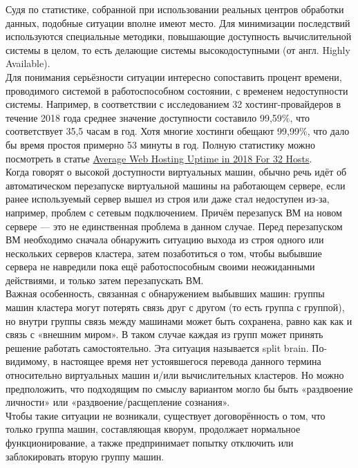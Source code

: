\documentclass[14pt, a4paper]{article}
\begin{document}
Судя по статистике, собранной при использовании реальных центров обработки данных, подобные
ситуации вполне имеют место. Для минимизации последствий используются специальные методики,
повышающие доступность вычислительной системы в целом, то есть делающие системы
высокодоступными (от англ. Highly Available).\\

Для понимания серьёзности ситуации интересно сопоставить процент времени, проводимого
системой в работоспособном состоянии, с временем недоступности системы. Например, в
соответствии с исследованием 32 хостинг-провайдеров в течение 2018 года среднее значение
доступности составило 99,59\%, что соответствует 35,5 часам в год. Хотя многие хостинги обещают
99,99\%, что дало бы время простоя примерно 53 минуты в год. Полную статистику можно посмотреть
в статье \href{https://hostingfacts.com/average-hosting-uptime-study/}{Average Web Hosting Uptime in 2018 For 32 Hosts}.\\

Когда говорят о высокой доступности виртуальных машин, обычно речь идёт об автоматическом
перезапуске виртуальной машины на работающем сервере, если ранее используемый сервер вышел
из строя или даже стал недоступен из-за, например, проблем с сетевым подключением. Причём
перезапуск ВМ на новом сервере — это не единственная проблема в данном случае. Перед
перезапуском ВМ необходимо сначала обнаружить ситуацию выхода из строя одного или нескольких
серверов кластера, затем позаботиться о том, чтобы выбывшие сервера не навредили пока ещё
работоспособным своими неожиданными действиями, и только затем перезапускать ВМ.\\

Важная особенность, связанная с обнаружением выбывших машин: группы машин кластера могут
потерять связь друг с другом (то есть группа с группой), но внутри группы связь между машинами
может быть сохранена, равно как как и связь с «внешним миром». В таком случае каждая из групп
может принять решение работать самостоятельно. Эта ситуация называется split brain. По-видимому,
в настоящее время нет устоявшегося перевода данного термина относительно виртуальных машин
и/или вычислительных кластеров. Но можно предположить, что подходящим по смыслу вариантом
могло бы быть «раздвоение личности» или «раздвоение/расщепление сознания».\\

Чтобы такие ситуации не возникали, существует договорённость о том, что только группа машин,
составляющая кворум, продолжает нормальное функционирование, а также предпринимает попытку
отключить или заблокировать вторую группу машин.\\
\end{document}
